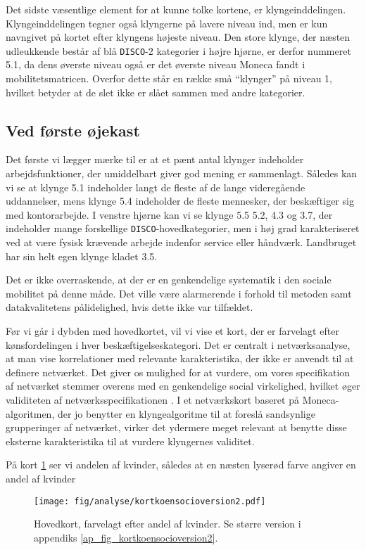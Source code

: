 Det sidste væsentlige element for at kunne tolke kortene, er klyngeinddelingen. Klyngeinddelingen tegner også klyngerne på lavere niveau ind, men er kun navngivet på kortet efter klyngens højeste niveau. Den store klynge, der næsten udleukkende består af blå \texttt{DISCO}-2 kategorier i højre hjørne, er derfor nummeret 5.1, da dens øverste niveau også er det øverste niveau Moneca fandt i mobilitetsmatricen. Overfor dette står en række små “klynger” på niveau 1, hvilket betyder at de slet ikke er slået sammen med andre kategorier.


\subsection{Ved første øjekast}

Det første vi lægger mærke til er at et pænt antal klynger indeholder arbejdsfunktioner, der umiddelbart giver god mening er sammenlagt. Således kan vi se at klynge 5.1 indeholder langt de fleste af de lange videregående uddannelser, mens klynge 5.4 indeholder de fleste mennesker, der beskæftiger sig med kontorarbejde. I venstre hjørne kan vi se klynge 5.5 5.2, 4.3 og 3.7, der indeholder mange forskellige \texttt{DISCO}-hovedkategorier, men i høj grad karakteriseret ved at være fysisk krævende arbejde indenfor service eller håndværk. Landbruget har sin helt egen klynge kladet 3.5.

Det er ikke overraskende, at der er en genkendelige systematik i den sociale mobilitet på denne måde. Det ville være alarmerende i forhold til metoden samt datakvalitetens pålidelighed, hvis dette ikke var tilfældet. 

Før vi går i dybden med hovedkortet, vil vi vise et kort, der er farvelagt efter kønsfordelingen i hver beskæftigelseskategori. Det er centralt i netværksanalyse, at man vise korrelationer med relevante karakteristika, der ikke er anvendt til at definere netværket. Det giver os mulighed for at vurdere, om vores specifikation af netværket stemmer overens med en genkendelige social virkelighed, hvilket øger validiteten af netværksspecifikationen \parencite[29]{Laumann1983}. I et netværkskort baseret på Moneca-algoritmen, der jo benytter en klyngealgoritme til at foreslå sandsynlige grupperinger af netværket, virker det ydermere meget relevant at benytte disse eksterne karakteristika til at vurdere klyngernes validitet.

\newpage
På kort \ref{fig_kortkoensocioversion2} ser vi andelen af kvinder, således at en næsten lyserød farve angiver en andel af kvinder   
%
\begin{figure}[H]
\begin{centering}
	\caption{Hovedkort, farvelagt efter andel af kvinder. Se større version i appendiks \ref{ap_fig_kortkoensocioversion2}.}
	\texttt{[image: fig/analyse/kortkoensocioversion2.pdf]}
	\label{fig_kortkoensocioversion2}
\end{centering}
\end{figure}
%


